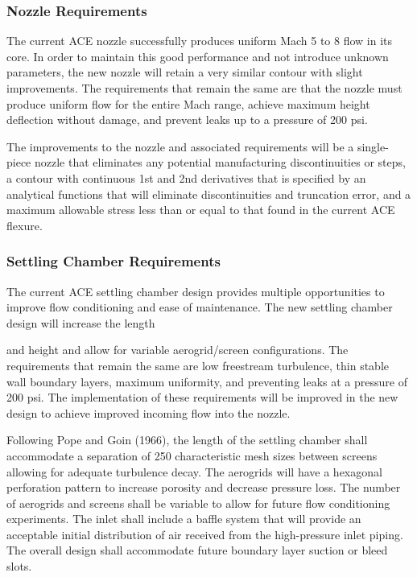 \subsubsection*{Nozzle Requirements}
The current ACE nozzle successfully produces uniform Mach 5 to 8 flow in its core. In order to maintain this good performance and not introduce unknown parameters, the new nozzle will retain a very similar contour with slight improvements. The requirements that remain the same are that the nozzle must produce uniform flow for the entire Mach range, achieve maximum height deflection without damage, and prevent leaks up to a pressure of 200 psi.

The improvements to the nozzle and associated requirements will be a single-piece nozzle that eliminates any potential manufacturing discontinuities or steps, a contour with continuous 1st and 2nd derivatives that is specified by an analytical functions that will eliminate discontinuities and truncation error, and a maximum allowable stress less than or equal to that found in the current ACE flexure.

\subsubsection*{Settling Chamber Requirements}
The current ACE settling chamber design provides multiple opportunities to improve flow conditioning and ease of maintenance. The new settling chamber design will increase the length

and height and allow for variable aerogrid/screen configurations. The requirements that remain the same are low freestream turbulence, thin stable wall boundary layers, maximum uniformity, and preventing leaks at a pressure of 200 psi. The implementation of these requirements will be improved in the new design to achieve improved incoming flow into the nozzle.

Following Pope and Goin (1966), the length of the settling chamber shall accommodate a separation of 250 characteristic mesh sizes between screens allowing for adequate turbulence decay. The aerogrids will have a hexagonal perforation pattern to increase porosity and decrease pressure loss. The number of aerogrids and screens shall be variable to allow for future flow conditioning experiments. The inlet shall include a baffle system that will provide an acceptable initial distribution of air received from the high-pressure inlet piping. The overall design shall accommodate future boundary layer suction or bleed slots.

